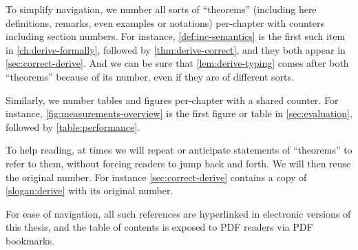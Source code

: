 To simplify navigation, we number all sorts of ``theorems'' (including here
definitions, remarks, even examples or notations)
per-chapter with counters including section numbers. For
instance, \cref{def:inc-semantics} is the first such item in
\cref{ch:derive-formally}, followed by \cref{thm:derive-correct}, and they both
appear in \cref{sec:correct-derive}. And we can be sure that \cref{lem:derive-typing}
comes after both ``theorems'' because of its number, even if they are of different sorts.

Similarly, we number tables and figures per-chapter with a shared counter. For instance,
\cref{fig:measurements-overview} is the first figure or table in \cref{sec:evaluation},
followed by \cref{table:performance}.

To help reading, at times we will repeat or anticipate statements of
``theorems'' to refer to them, without forcing readers to jump back and forth.
We will then reuse the original number.
For instance \cref{sec:correct-derive} contains a copy of \cref{slogan:derive}
with its original number.

For ease of navigation, all such references are hyperlinked in electronic
versions of this thesis, and the table of contents is exposed to PDF readers via
PDF bookmarks.






